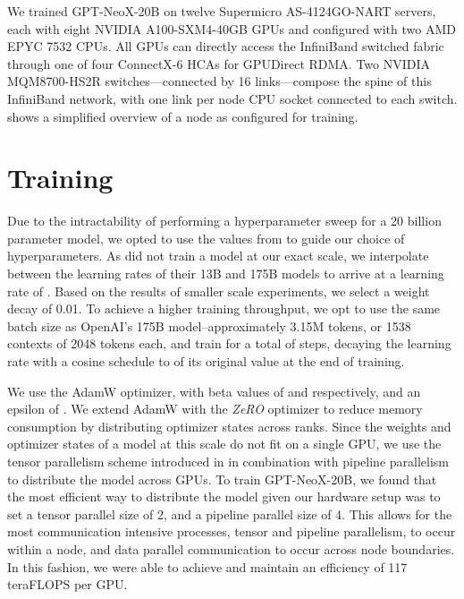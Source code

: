 \documentclass[11pt]{article}
\newcommand{\model}{GPT-NeoX-20B}
\begin{document}
We trained \model{} on twelve Supermicro AS-4124GO-NART servers, each with eight NVIDIA A100-SXM4-40GB GPUs and configured with two AMD EPYC 7532 CPUs. All GPUs can directly access the InfiniBand switched fabric through one of four ConnectX-6 HCAs for GPUDirect RDMA. Two NVIDIA MQM8700-HS2R switches---connected by 16 links---compose the spine of this InfiniBand network, with one link per node CPU socket connected to each switch.  shows a simplified overview of a node as configured for training.

\section{Training}

Due to the intractability of performing a hyperparameter sweep for a 20 billion parameter model, we opted to use the values from \citet{brown2020language} to guide our choice of hyperparameters. As \citet{brown2020language} did not train a model at our exact scale, we interpolate between the learning rates of their 13B and 175B models to arrive at a learning rate of . Based on the results of smaller scale experiments, we select a weight decay of 0.01. To achieve a higher training throughput, we opt to use the same batch size as OpenAI's 175B model--approximately 3.15M tokens, or 1538 contexts of 2048 tokens each, and train for a total of  steps, decaying the learning rate with a cosine schedule to  of its original value at the end of training.

We use the AdamW \citep{loshchilov2019decoupled} optimizer, with beta values of  and  respectively, and an epsilon of . We extend AdamW with the \textit{ZeRO} optimizer \citep{rajbhandari2020zero} to reduce memory consumption by distributing optimizer states across ranks. Since the weights and optimizer states of a model at this scale do not fit on a single GPU, we use the tensor parallelism scheme introduced in \citet{shoeybi2020megatronlm} in combination with pipeline parallelism \citep{harlap2018pipedream} to distribute the model across GPUs. To train \model{}, we found that the most efficient way to distribute the model given our hardware setup was to set a tensor parallel size of 2, and a pipeline parallel size of 4. This allows for the most communication intensive processes, tensor and pipeline parallelism, to occur within a node, and data parallel communication to occur across node boundaries. In this fashion, we were able to achieve and maintain an efficiency of 117 teraFLOPS per GPU.
\end{document}
